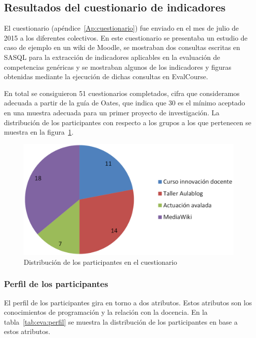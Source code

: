 \subsection{Resultados del cuestionario de indicadores}

El cuestionario (apéndice~\ref{Ap:cuestionario}) fue enviado en el mes de julio de 2015 a los diferentes colectivos. En este cuestionario se presentaba un estudio de caso de ejemplo en un wiki de Moodle, se mostraban dos consultas escritas en SASQL para la extracción de indicadores aplicables en la evaluación de competencias genéricas y se mostraban algunos de los indicadores y figuras obtenidas mediante la ejecución de dichas consultas en EvalCourse. 

En total se consiguieron 51 cuestionarios completados, cifra que consideramos adecuada a partir de la guía de Oates, que indica que 30 es el mínimo aceptado en una muestra adecuada para un primer proyecto de investigación. La distribución de los participantes con respecto a los grupos a los que pertenecen se muestra en la figura~\ref{fig:ResultadosParticipantes}.

\begin{figure}
  \begin{center}
    \includegraphics[scale=0.3]{ResultadosParticipantes.png}
  \end{center}
  \caption{Distribución de los participantes en el cuestionario}
  \label{fig:ResultadosParticipantes}
\end{figure}

\subsubsection{Perfil de los participantes}

El perfil de los participantes gira en torno a dos atributos. Estos atributos son los conocimientos de programación y la relación con la docencia. En la tabla~\ref{tab:eva:perfil} se muestra la distribución de los participantes en base a estos atributos.

